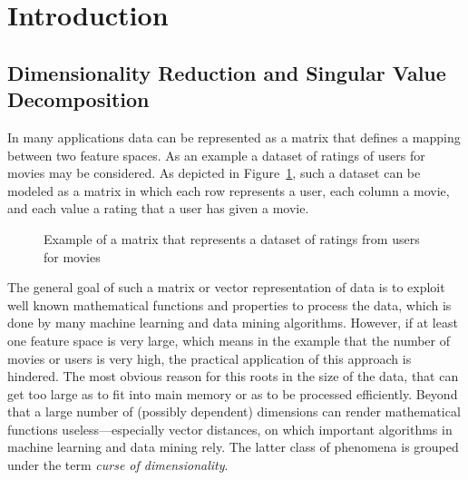 \section{Introduction}

\subsection{Dimensionality Reduction and Singular Value Decomposition}

In many applications data can be represented as a matrix that defines a mapping between two feature spaces. As an example a dataset of ratings of users for movies may be considered. As depicted in Figure~\ref{fig:exmpl_matrix}, such a dataset can be modeled as a matrix in which each row represents a user, each column a movie, and each value a rating that a user has given a movie. 

\begin{figure}[h]
\centering
{}
\caption{Example of a matrix that represents a dataset of ratings from users for movies}
\label{fig:exmpl_matrix}
\end{figure}

The general goal of such a matrix or vector representation of data is to exploit well known mathematical functions and properties to process the data, which is done by many machine learning and data mining algorithms. However, if at least one feature space is very large, which means in the example that the number of movies or users is very high, the practical application of this approach is hindered. The most obvious reason for this roots in the size of the data, that can get too large as to fit into main memory or as to be processed efficiently. Beyond that a large number of (possibly dependent) dimensions can render mathematical functions useless---especially vector distances, on which important algorithms in machine learning and data mining rely. The latter class of phenomena is grouped under the term \textsl{curse of dimensionality}.


